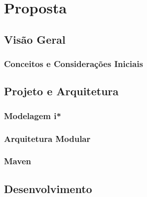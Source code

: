 \chapter{Proposta}
    \label{cap:proposta}

    \section{Visão Geral}
        \label{cap:proposta-sec:overview}
        \subsection{Conceitos e Considerações Iniciais}
    \section{Projeto e Arquitetura}
        \label{cap:proposta-sec:design}
        \subsection{Modelagem i*}
        \subsection{Arquitetura Modular}
        \subsection{Maven}
    \section{Desenvolvimento}
        \label{cap:proposta-sec:development}
